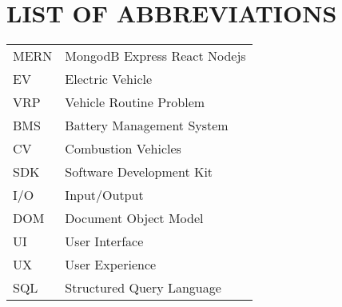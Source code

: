 \newpage
\section*{LIST OF ABBREVIATIONS}
\begin{tabular}{l l}      
{MERN}&{MongodB Express React Nodejs} \\
{EV}&{Electric Vehicle} \\
{VRP}&{Vehicle Routine Problem} \\
{BMS}&{Battery Management System} \\
{CV}&{Combustion Vehicles} \\
{SDK}&{Software Development Kit} \\
{I/O}&{Input/Output} \\
{DOM}&{Document Object Model} \\
{UI}&{User Interface} \\
{UX}&{User Experience} \\
{SQL}&{Structured Query Language} \\

\end{tabular}
